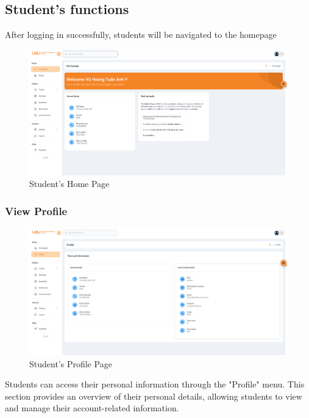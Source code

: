 \subsection{Student's functions}
After logging in successfully, students will be navigated to the homepage

\begin{figure}[H]
	\centering
	\includegraphics[width=1.0\linewidth]{graphics/gui/student/homepage}
	\caption{Student's Home Page}
	\label{fig:gui-std-homepage}
\end{figure}


	\subsubsection{View Profile}
	\begin{figure}[H]
		\centering
		\includegraphics[width=1.0\linewidth]{graphics/gui/student/profile}
		\caption{Student's Profile Page}
		\label{fig:gui-std-profile}
	\end{figure}
	Students can access their personal information through the "Profile" menu. This section provides an overview of their personal details, allowing students to view and manage their account-related information.
	
	
	
